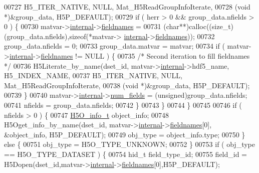 \begin{DoxyCode}
00727                 H5\_ITER\_NATIVE, NULL, Mat\_H5ReadGroupInfoIterate,
00728                 (\textcolor{keywordtype}{void} *)&group\_data, H5P\_DEFAULT);
00729             \textcolor{keywordflow}{if} ( herr > 0 && group\_data.nfields > 0 ) \{
00730                 matvar->\hyperlink{group___m_a_t_a6e97e3ed9f40c49322c18561c2a94e92}{internal}->\hyperlink{structmatvar__internal_a7574d000bfc98ad4860ae6590b8d4985}{fieldnames} =
00731                     (\textcolor{keywordtype}{char}**)calloc((\textcolor{keywordtype}{size\_t})(group\_data.nfields),\textcolor{keyword}{sizeof}(*matvar->
      \hyperlink{group___m_a_t_a6e97e3ed9f40c49322c18561c2a94e92}{internal}->\hyperlink{structmatvar__internal_a7574d000bfc98ad4860ae6590b8d4985}{fieldnames}));
00732                 group\_data.nfields = 0;
00733                 group\_data.matvar = matvar;
00734                 \textcolor{keywordflow}{if} ( matvar->\hyperlink{group___m_a_t_a6e97e3ed9f40c49322c18561c2a94e92}{internal}->\hyperlink{structmatvar__internal_a7574d000bfc98ad4860ae6590b8d4985}{fieldnames} != NULL ) \{
00735                     \textcolor{comment}{/* Second iteration to fill fieldnames */}
00736                     H5Literate\_by\_name(dset\_id, matvar->\hyperlink{group___m_a_t_a6e97e3ed9f40c49322c18561c2a94e92}{internal}->hdf5\_name, H5\_INDEX\_NAME,
00737                         H5\_ITER\_NATIVE, NULL, Mat\_H5ReadGroupInfoIterate,
00738                         (\textcolor{keywordtype}{void} *)&group\_data, H5P\_DEFAULT);
00739                 \}
00740                 matvar->\hyperlink{group___m_a_t_a6e97e3ed9f40c49322c18561c2a94e92}{internal}->\hyperlink{structmatvar__internal_a93fc447484f455eddf9334f2e9e411c2}{num\_fields} = (unsigned)group\_data.nfields;
00741                 nfields = group\_data.nfields;
00742             \}
00743         \}
00744     \}
00745 
00746     \textcolor{keywordflow}{if} ( nfields > 0 ) \{
00747         \hyperlink{struct_h5_o__info__t}{H5O\_info\_t} object\_info;
00748         H5Oget\_info\_by\_name(dset\_id, matvar->\hyperlink{group___m_a_t_a6e97e3ed9f40c49322c18561c2a94e92}{internal}->\hyperlink{structmatvar__internal_a7574d000bfc98ad4860ae6590b8d4985}{fieldnames}[0], &object\_info, 
      H5P\_DEFAULT);
00749         obj\_type = object\_info.type;
00750     \} \textcolor{keywordflow}{else} \{
00751         obj\_type = H5O\_TYPE\_UNKNOWN;
00752     \}
00753     \textcolor{keywordflow}{if} ( obj\_type == H5O\_TYPE\_DATASET ) \{
00754         hid\_t field\_type\_id;
00755         field\_id = H5Dopen(dset\_id,matvar->\hyperlink{group___m_a_t_a6e97e3ed9f40c49322c18561c2a94e92}{internal}->\hyperlink{structmatvar__internal_a7574d000bfc98ad4860ae6590b8d4985}{fieldnames}[0],H5P\_DEFAULT);

\end{DoxyCode}
